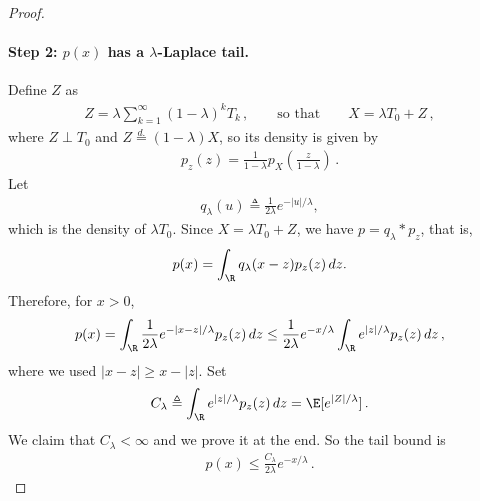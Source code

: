 \begin{proof}
    \paragraph{Step 2: $p(x)$ has a $\lambda$-Laplace tail.}
    Define $Z$ as
    \begin{align}
        Z = \lambda\sum_{k=1}^\infty (1-\lambda)^k T_k\,,
        \qquad\text{so that}\qquad
        X = \lambda T_0 + Z\,,
    \end{align}
    where $Z \perp T_0$ and $Z \stackrel{d.}{=}(1-\lambda)X$,
    so its density is given by
    \begin{align}
        p_z(z) = \frac{1}{1-\lambda} p_X\left(\frac{z}{1-\lambda}\right)\,.
    \end{align}
    Let
    \begin{align}
        q_\lambda(u)\triangleq \frac{1}{2\lambda}e^{-|u|/\lambda},
    \end{align}
    which is the density of $\lambda T_0$.
    Since $X=\lambda T_0+Z$, we have $p=q_\lambda * p_z$, that is,
    \begin{align}
        p(x)=\int_{\R} q_\lambda(x-z)p_z(z)\,dz.
    \end{align}
    Therefore, for $x>0$,
    \begin{align}
        p(x)
        =
        \int_{\R}\frac{1}{2\lambda}e^{-|x-z|/\lambda}p_z(z)\,dz
        \le
        \frac{1}{2\lambda}e^{-x/\lambda}\int_{\R}e^{|z|/\lambda}p_z(z)\,dz\,,
    \end{align}
    where we used $|x-z|\ge x-|z|$.
    Set
    \begin{align}
        C_\lambda \triangleq \int_{\R} e^{|z|/\lambda}p_z(z)\,dz = \E[e^{|Z|/\lambda}]\,.
    \end{align}
    We claim that $C_\lambda<\infty$ and we prove it at the end.
    So the tail bound is
    \begin{align}
        p(x) \le \frac{C_\lambda}{2\lambda}e^{-x/\lambda}\,.
        \label{eq:laplace_p_tail_bound}
    \end{align}


\end{proof}
